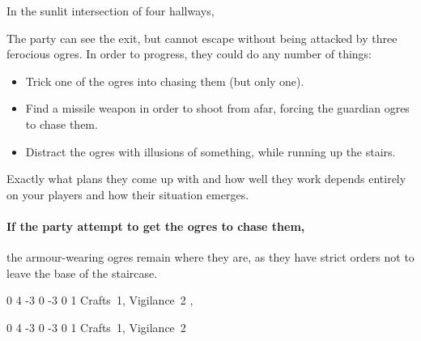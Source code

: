 \begin{multicols}{2}
\begin{boxtext}
  In the sunlit intersection of four hallways,
  \iftoggle{hardcore}%
    {four ogres sit playing a game of dice.  Two are clad in black leather armour, with a massive sword by their side.
    Another sucks on a horse's uncooked head, while the third goes for a piss behind the staircase.}%
    {three ogres sit playing dice.
    Two are clad in black, leather armour, apparently pieced together from multiple suits.
    The third sits watching them play some dice game.}%

\end{boxtext}

The party can see the exit, but cannot escape without being attacked by three ferocious ogres.
In order to progress, they could do any number of things:

\begin{itemize}

  \item{Trick one of the ogres into chasing them (but only one).}
  \item{Find a missile weapon in order to shoot from afar, forcing the guardian ogres to chase them.}
  \item{Distract the ogres with illusions of something, while running up the stairs.}

\end{itemize}

Exactly what plans they come up with and how well they work depends entirely on your players and how their situation emerges.

\paragraph{If the party attempt to get the ogres to chase them,}
the armour-wearing ogres remain where they are, as they have strict orders not to leave the base of the staircase.


{0}%
{4}%
{{-3}%
{0}%
{-3}}%
{0}%
{1}%
{Crafts~1, Vigilance~2}%
{\greatsword, \partialleather}%
{}


\label{chasingogre}

{0}%
{4}%
{{-3}%
{0}%
{-3}}%
{0}%
{1}%
{Crafts~1, Vigilance~2}%
{\greatclub}%
{}


\end{multicols}
